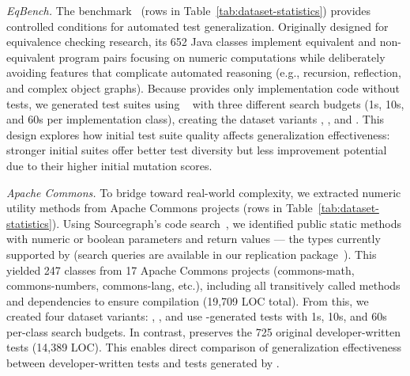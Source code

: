 \textit{EqBench.}
The \DatasetEqBench{} benchmark~\cite{badihi_2021_eqbench}
(rows \DatasetsEqBenchEs{} in Table~\ref{tab:dataset-statistics})
provides controlled conditions
for automated test generalization.
Originally designed for equivalence checking research,
its 652 Java classes implement equivalent and non-equivalent program pairs
focusing on numeric computations while deliberately avoiding
features that complicate automated reasoning (e.g., recursion, reflection, and complex object graphs).
Because \DatasetEqBench{} provides only implementation code without tests,
we generated test suites using \ToolEvoSuite{}~\cite{fraser_2011_evosuite}
with three different search budgets (1s, 10s, and 60s per implementation class),
creating the dataset variants \DatasetEqBenchA{}, \DatasetEqBenchB{}, and \DatasetEqBenchC{}.
This design explores how initial test suite quality affects generalization effectiveness:
stronger initial suites offer better test diversity but less improvement potential
due to their higher initial mutation scores.



\textit{Apache Commons.}
To bridge toward real-world complexity,
we extracted numeric utility methods from Apache Commons projects
(rows \DatasetsCommons{} in Table~\ref{tab:dataset-statistics}).
Using Sourcegraph's code search~\cite{sourcegraph},
we identified public static methods with numeric or boolean parameters and return values ---
the types currently supported by \ToolTeralizer{}
(search queries are available in our replication package~\cite{replicationpackage}).
This yielded 247 classes from 17 Apache Commons projects
(commons-math, commons-numbers, commons-lang, etc.),
including all transitively called methods and dependencies
to ensure compilation (19,709 LOC total).
From this, we created four dataset variants:
\DatasetCommonsA{}, \DatasetCommonsB{}, and \DatasetCommonsC{}
use \ToolEvoSuite{}-generated tests
with 1s, 10s, and 60s per-class search budgets.
In contrast, \DatasetCommonsDev{} preserves the 725 original developer-written tests (14,389 LOC).
This enables direct comparison of generalization effectiveness between
developer-written tests and tests generated by \ToolEvoSuite{}.

